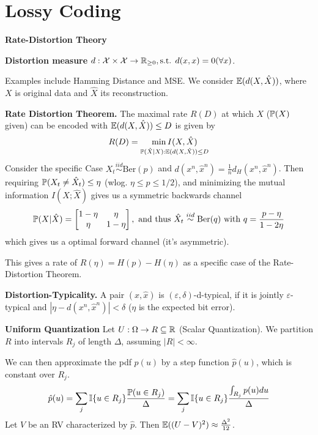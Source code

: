 \section{Lossy Coding}
\textbf{Rate-Distortion Theory}

\textbf{Distortion measure} 
\(d: \mathcal{X} \times \mathcal{X} \to \R_{\geq 0}, \text{s.t. } d(x, x) = 0 (\forall x)\).

Examples include Hamming Distance and MSE. 
We consider \(\E(d(X, \hat{X}))\), where \(X\) is original data and \(\hat{X}\) its reconstruction. 

\textbf{Rate Distortion Theorem.}
The maximal rate \(R(D)\) at which \(X\) (\(\P(X)\) given) can 
be encoded with  \(\E(d(X, \hat{X})) \leq D\) is given by
\[R(D) = \underset{\P(\hat{X}|X): \E(d(X, \hat{X})) \leq D}{\min I(X, \hat{X})}\]
Consider the specific Case \(X_t \overset{iid}{\sim} \text{Ber}(p)\) and \(d(x^n, \hat{x}^n) = \frac{1}{n}d_H(x^n, \hat{x}^n)\).
Then requiring \(\P(X_t \neq \hat{X}_t) \leq \eta\) (wlog. \(\eta \leq p\leq 1/2\)), 
and minimizing the mutual information \(I(X;\hat{X})\) gives us a symmetric backwards channel 
\[\P(X|\hat{X}) = \left[\begin{matrix}
    1-\eta & \eta\\
    \eta & 1-\eta
\end{matrix}\right], \text{ and thus } \hat{X}_t \overset{iid}{\sim} \text{Ber}(q) \text{ with } q = \frac{p - \eta}{1-2\eta} \]
which gives us a optimal forward channel (it's asymmetric).

This gives a rate of \(R(\eta) = H(p) - H(\eta)\) as a specific case of the Rate-Distortion Theorem.

\textbf{Distortion-Typicality.} A pair \((x, \hat{x})\) is \((\varepsilon, \delta)\)-d-typical, 
if it is jointly \(\varepsilon\)-typical and \(|\eta - d(x^n, \hat{x}^n)| < \delta\) (\(\eta\) is the expected bit error).

\vspace*{1mm}
\textbf{Uniform Quantization}
Let \(U: \Omega \to R \subseteq \R\) (Scalar Quantization). 
We partition \(R\) into intervals \(R_j\) of length \(\Delta\), assuming \(|R| < \infty\).

We can then approximate the pdf \(p(u)\) by a step function \(\hat{p}(u)\), which is constant over \(R_j\).
\[\hat{p}(u) = \sum_{j}\mathbb{I}\{u \in R_j\} \frac{\P(u \in R_j)}{\Delta} 
= \sum_{j}\mathbb{I}\{u \in R_j\} \frac{\int_{R_j}p(u)du}{\Delta}\]
Let \(V\) be an RV characterized by \(\hat{p}\). Then \(\E((U-V)^2) \approx \frac{\Delta^2}{12}\).

